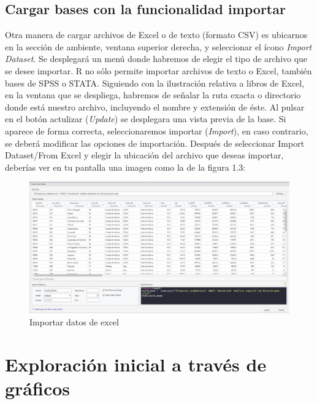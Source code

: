 \documentclass[
  11pt,
  oneside]{book}
\begin{document}
\hypertarget{cargar-bases-con-la-funcionalidad-importar}{%
\subsection{Cargar bases con la funcionalidad importar}\label{cargar-bases-con-la-funcionalidad-importar}}

Otra manera de cargar archivos de Excel o de texto (formato CSV) es ubicarnos en la sección de ambiente, ventana superior derecha, y seleccionar el ícono \emph{Import Dataset}. Se desplegará un menú donde habremos de elegir el tipo de archivo que se desee importar. R no sólo permite importar archivos de texto o Excel, también bases de SPSS o STATA. Siguiendo con la ilustración relativa a libros de Excel, en la ventana que se despliega, habremos de señalar la ruta exacta o directorio donde está nuestro archivo, incluyendo el nombre y extensión de éste. Al pulsar en el botón actulizar (\emph{Update}) se desplegara una vista previa de la base. Si aparece de forma correcta, seleccionaremos importar (\emph{Import}), en caso contrario, se deberá modificar las opciones de importación. Después de seleccionar Import Dataset/From Excel y elegir la ubicación del archivo que deseas importar, deberías ver en tu pantalla una imagen como la de la figura 1.3:

\begin{figure}

{\centering \includegraphics[width=1.2\linewidth]{recursos intro/Figura_3-Importar} 

}

\caption{Importar datos de excel}\label{fig:unnamed-chunk-31}
\end{figure}

\hypertarget{exploraciuxf3n-inicial-a-travuxe9s-de-gruxe1ficos}{%
\section{Exploración inicial a través de gráficos}\label{exploraciuxf3n-inicial-a-travuxe9s-de-gruxe1ficos}}
\end{document}
